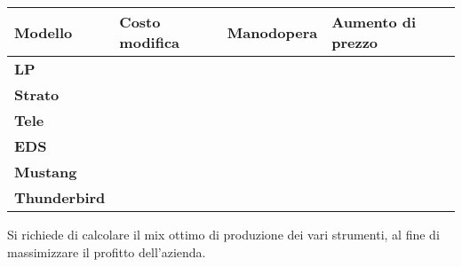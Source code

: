 \begin{table}[htbp]
\begin{center}
\begin{tabular}{|l|l|l|l|}
\hline
\textbf{Modello}     & \textbf{Costo modifica} & \textbf{Manodopera} & \textbf{Aumento di prezzo} \\ \hline
\textbf{LP}          &                         &                     &					         \\ \hline
\textbf{Strato}      &                         &                     &					         \\ \hline
\textbf{Tele}        &                         &                     &					         \\ \hline
\textbf{EDS}         &                         &                     &					         \\ \hline
\textbf{Mustang}     &                         &                     &					         \\ \hline
\textbf{Thunderbird} &                         &                     &							  \\ \hline     
\end{tabular}
\end{center}
\end{table}

Si richiede di calcolare il mix ottimo di produzione dei vari strumenti, al fine di massimizzare il profitto dell'azienda.